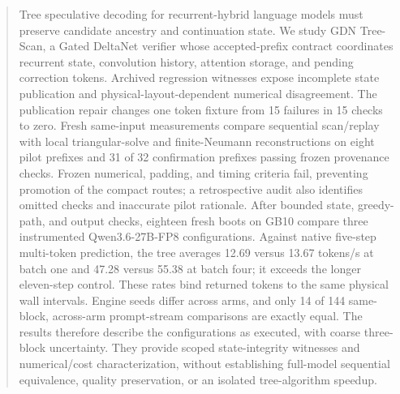 \begin{abstract}
Tree speculative decoding for recurrent-hybrid language models must preserve candidate ancestry and continuation state. We study GDN Tree-Scan, a Gated DeltaNet verifier whose accepted-prefix contract coordinates recurrent state, convolution history, attention storage, and pending correction tokens. Archived regression witnesses expose incomplete state publication and physical-layout-dependent numerical disagreement. The publication repair changes one token fixture from 15 failures in 15 checks to zero. Fresh same-input measurements compare sequential scan/replay with local triangular-solve and finite-Neumann reconstructions on eight pilot prefixes and 31 of 32 confirmation prefixes passing frozen provenance checks. Frozen numerical, padding, and timing criteria fail, preventing promotion of the compact routes; a retrospective audit also identifies omitted checks and inaccurate pilot rationale. After bounded state, greedy-path, and output checks, eighteen fresh boots on GB10 compare three instrumented Qwen3.6-27B-FP8 configurations. Against native five-step multi-token prediction, the tree averages 12.69 versus 13.67 tokens/s at batch one and 47.28 versus 55.38 at batch four; it exceeds the longer eleven-step control. These rates bind returned tokens to the same physical wall intervals. Engine seeds differ across arms, and only 14 of 144 same-block, across-arm prompt-stream comparisons are exactly equal. The results therefore describe the configurations as executed, with coarse three-block uncertainty. They provide scoped state-integrity witnesses and numerical/cost characterization, without establishing full-model sequential equivalence, quality preservation, or an isolated tree-algorithm speedup.
\end{abstract}
